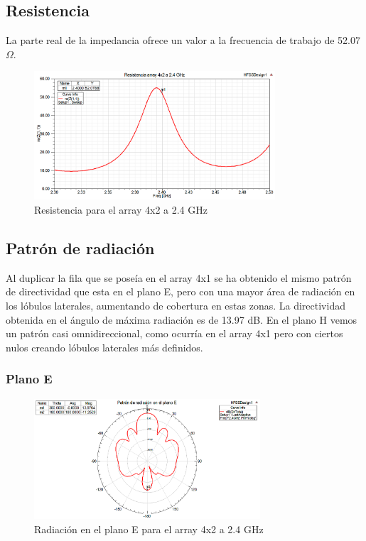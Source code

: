 \subsection{Resistencia}
\par La parte real de la impedancia ofrece un valor a la frecuencia de trabajo de 52.07 $\Omega$.
\\
\begin{figure}[H]
    \centering
        \includegraphics[width=0.8\textwidth]{archivos/analisis/4x21/3}
        \caption{Resistencia para el array 4x2 a 2.4 GHz}
        \label{fig:resis4x21}
\end{figure}

\subsection{Patrón de radiación}
\par Al duplicar la fila que se poseía en el array 4x1 se ha obtenido el mismo patrón de directividad que esta en el plano E, pero con una mayor área de radiación en los lóbulos laterales, aumentando de cobertura en estas zonas. La directividad obtenida en el ángulo de máxima radiación es de 13.97 dB. En el plano H vemos un patrón casi omnidireccional, como ocurría en el array 4x1 pero con ciertos nulos creando lóbulos laterales más definidos.
\\
\subsubsection{Plano E}
\begin{figure}[H]
    \centering
        \includegraphics[width=0.75\textwidth]{archivos/analisis/4x21/4}
        \caption{Radiación en el plano E para el array 4x2 a 2.4 GHz}
        \label{fig:E4x21}
\end{figure}

